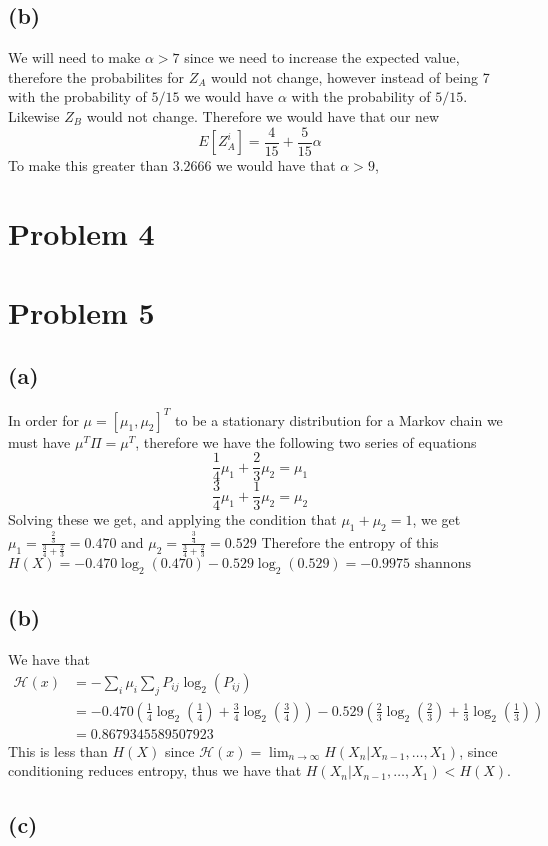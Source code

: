 \subsection*{(b)}
We will need to make $\alpha>7$ since we need to increase the expected value,
therefore the probabilites for $Z_A$ would not change, however instead 
of being 7 with the probability of $5/15$ we would have $\alpha$ with the
probability of $5/15$. Likewise $Z_B$ would not change. Therefore we would have that
our new 
$$E[Z_A^i]=\frac{4}{15}+\frac{5}{15}\alpha$$
To make this greater than $3.2666$ we would have that
$\boxed{\alpha>9}$, 
\section*{Problem 4}
\section*{Problem 5}
\subsection*{(a)}
In order for $\mu=[\mu_1,\mu_2]^T$ to be a stationary distribution for 
a Markov chain we must have $\mu^T\Pi=\mu^T$, therefore we have the 
following two series of equations
$$\frac{1}{4}\mu_1+\frac{2}{3}\mu_2=\mu_1$$
$$\frac{3}{4}\mu_1+\frac{1}{3}\mu_2=\mu_2$$
Solving these we get, and applying the condition that $\mu_1+\mu_2=1$,
we get $\mu_1=\frac{\frac{2}{3}}{\frac{3}{4}+\frac{2}{3}}=\boxed{0.470}$ and
$\mu_2=\frac{\frac{3}{4}}{\frac{3}{4}+\frac{2}{3}}=\boxed{0.529}$ Therefore the 
entropy of this $H(X)=-0.470\log_2(0.470)-0.529\log_2(0.529)=\boxed{-0.9975\text{ shannons}}$
\subsection*{(b)}
We have that 
\begin{align*}
    \mathcal{H}(x)&=-\sum_{i}\mu_i\sum_{j}P_{ij}\log_2(P_{ij})\\
    &=-0.470\left(\frac{1}{4}\log_2\left(\frac{1}{4}\right)+
    \frac{3}{4}\log_2\left(\frac{3}{4}\right)\right)-0.529\left(\frac{2}{3}\log_2\left(\frac{2}{3}\right)+
    \frac{1}{3}\log_2\left(\frac{1}{3}\right)\right)\\
    &=\boxed{0.8679345589507923}
\end{align*}
This is less than $H(X)$ since 
$\mathcal{H}(x)=\lim_{n\to\infty}H(X_n|X_{n-1},\dots,X_1)$, 
since conditioning reduces entropy, thus we have that 
$H(X_n|X_{n-1},\dots,X_1)<H(X)$.
\subsection*{(c)}

